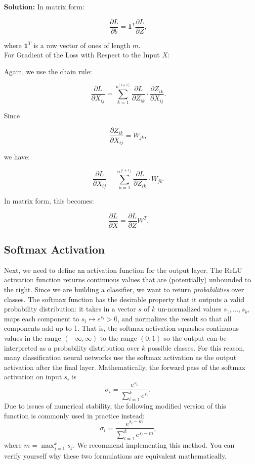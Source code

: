 \documentclass{article}
\newenvironment{solution}{\color{blue} \smallskip \textbf{Solution:}}{}
\begin{document}
\begin{solution}
In matrix form:

\[
\frac{\partial L}{\partial b} = \mathbf{1}^T \frac{\partial L}{\partial Z},
\]

where \(\mathbf{1}^T\) is a row vector of ones of length \(m\).\\

For Gradient of the Loss with Respect to the Input \(X\):

Again, we use the chain rule:

\[
\frac{\partial L}{\partial X_{ij}} = \sum_{k=1}^{n^{[l+1]}} \frac{\partial L}{\partial Z_{ik}} \cdot \frac{\partial Z_{ik}}{\partial X_{ij}}.
\]

Since

\[
\frac{\partial Z_{ik}}{\partial X_{ij}} = W_{jk},
\]

we have:

\[
\frac{\partial L}{\partial X_{ij}} = \sum_{k=1}^{n^{[l+1]}} \frac{\partial L}{\partial Z_{ik}} \cdot W_{jk}.
\]

In matrix form, this becomes:

\[
\frac{\partial L}{\partial X} = \frac{\partial L}{\partial Z} W^T.
\]

 
 
 
\end{solution}

\newpage
\subsection{Softmax Activation}
Next, we need to define an activation function for the output layer. 
The ReLU activation function returns continuous values that are (potentially) unbounded to the right. 
Since we are building a classifier, we want to return \textit{probabilities} over classes. 
The softmax function has the desirable property that it outputs a valid probability distribution: it takes in a vector $s$ of $k$ un-normalized values $s_1, \ldots, s_k$, maps each component to $s_i \mapsto e^{s_i} > 0$, and normalizes the result so that all components add up to $1$. 
That is, the softmax activation squashes continuous values in the range $(-\infty, \infty)$ to the range $(0, 1)$ so the output can be interpreted as a probability distribution over $k$ possible classes. 
For this reason, many classification neural networks use the softmax activation as the output activation after the final layer. 
Mathematically, the forward pass of the softmax activation on input $s_i$ is 
\[
    \sigma_i = \frac{e^{s_i}}{\sum_{l=1}^{k} e^{s_l}},
\]
Due to issues of numerical stability, the following modified version of this function is commonly used in practice instead:
\[
    \sigma_i = \frac{e^{s_i - m}}{\sum_{l=1}^{k} e^{s_l-m}},
\]
where $m = \max_{j=1}^k s_j$. 
We recommend implementing this method. 
You can verify yourself why these two formulations are equivalent mathematically.
\end{document}
